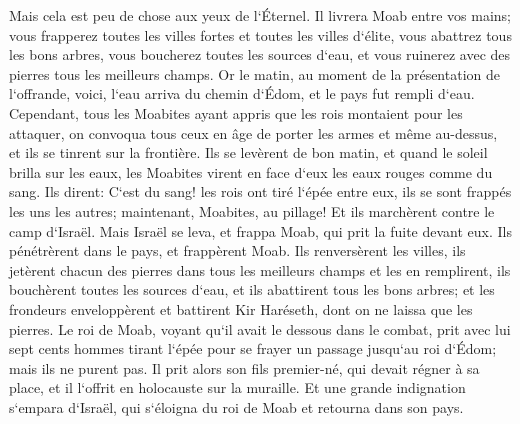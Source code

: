 \verse Mais cela est peu de chose aux yeux de l`Éternel. Il livrera Moab entre vos mains; 
\verse vous frapperez toutes les villes fortes et toutes les villes d`élite, vous abattrez tous les bons arbres, vous boucherez toutes les sources d`eau, et vous ruinerez avec des pierres tous les meilleurs champs. 
\verse Or le matin, au moment de la présentation de l`offrande, voici, l`eau arriva du chemin d`Édom, et le pays fut rempli d`eau. 
\verse Cependant, tous les Moabites ayant appris que les rois montaient pour les attaquer, on convoqua tous ceux en âge de porter les armes et même au-dessus, et ils se tinrent sur la frontière. 
\verse Ils se levèrent de bon matin, et quand le soleil brilla sur les eaux, les Moabites virent en face d`eux les eaux rouges comme du sang. 
\verse Ils dirent: C`est du sang! les rois ont tiré l`épée entre eux, ils se sont frappés les uns les autres; maintenant, Moabites, au pillage! 
\verse Et ils marchèrent contre le camp d`Israël. Mais Israël se leva, et frappa Moab, qui prit la fuite devant eux. Ils pénétrèrent dans le pays, et frappèrent Moab. 
\verse Ils renversèrent les villes, ils jetèrent chacun des pierres dans tous les meilleurs champs et les en remplirent, ils bouchèrent toutes les sources d`eau, et ils abattirent tous les bons arbres; et les frondeurs enveloppèrent et battirent Kir Haréseth, dont on ne laissa que les pierres. 
\verse Le roi de Moab, voyant qu`il avait le dessous dans le combat, prit avec lui sept cents hommes tirant l`épée pour se frayer un passage jusqu`au roi d`Édom; mais ils ne purent pas. 
\verse Il prit alors son fils premier-né, qui devait régner à sa place, et il l`offrit en holocauste sur la muraille. Et une grande indignation s`empara d`Israël, qui s`éloigna du roi de Moab et retourna dans son pays. 

